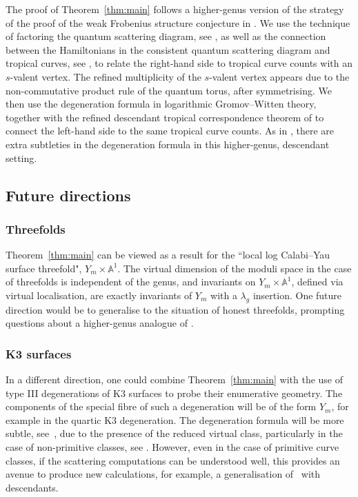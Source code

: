\documentclass[11pt]{amsart}
\numberwithin{equation}{section}
\theoremstyle{plain}
\theoremstyle{remark}
\theoremstyle{definition}
\newcommand{\AAA}{\mathbb{A}}
\begin{document}
The proof of Theorem~\ref{thm:main} follows a higher-genus version of the strategy of the proof of the weak Frobenius structure conjecture in \cite{mandel2021theta}. We use the technique of factoring the quantum scattering diagram, see \cite{gross2010vertex}, as well as the connection between the Hamiltonians in the consistent quantum scattering diagram and tropical curves, see \cite{bousseau2020quantumtrop,filippini2015block}, to relate the right-hand side to tropical curve counts with an $s$-valent vertex. The refined multiplicity of the $s$-valent vertex appears due to the non-commutative product rule of the quantum torus, after symmetrising. We then use the degeneration formula in logarithmic Gromov--Witten theory, together with the refined descendant tropical correspondence theorem of \cite{kennedyhunt2023tropical} to connect the left-hand side to the same tropical curve counts. As in \cite{kennedyhunt2023tropical}, there are extra subtleties in the degeneration formula in this higher-genus, descendant setting. 

\subsection{Future directions}
\subsubsection{Threefolds}\label{section : threefolds} Theorem~\ref{thm:main} can be viewed as a result for the ``local log Calabi--Yau surface threefold", $Y_m \times \AAA^1$. The virtual dimension of the moduli space in the case of threefolds is independent of the genus, and invariants on $Y_m \times \AAA^1$, defined via virtual localisation, are exactly invariants of $Y_m$ with a $\lambda_g$ insertion. One future direction would be to generalise to the situation of honest threefolds, prompting questions about a higher-genus analogue of \cite{arguz2022higher}.
\subsubsection{K3 surfaces} In a different direction, one could combine Theorem~\ref{thm:main} with the use of type III degenerations of K3 surfaces to probe their enumerative geometry. The components of the special fibre of such a degeneration will be of the form $Y_m$, for example in the quartic K3 degeneration. The degeneration formula will be more subtle, see~\cite[Section 4]{maulik2010curves}, due to the presence of the reduced virtual class, particularly in the case of non-primitive classes, see \cite{blomme2024correlatedgromovwitteninvariants}. However, even in the case of primitive curve classes, if the scattering computations can be understood well, this provides an avenue to produce new calculations, for example, a generalisation of~\cite[Theorem 3]{maulik2010curves} with descendants.
\end{document}
